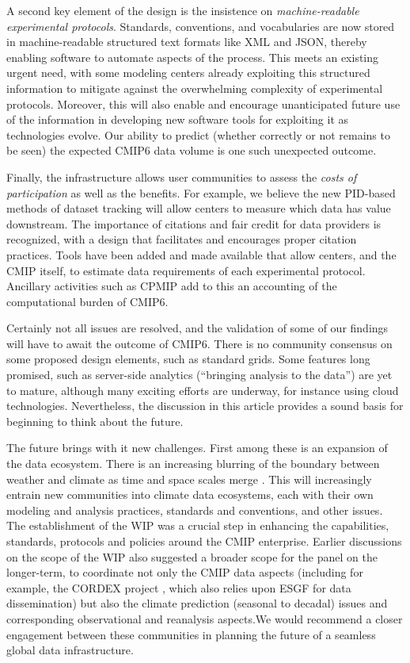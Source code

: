\documentclass[gmd,manuscript]{copernicus}
\newcommand{\pllabel}[1]{\label{p-#1}\linelabel{l-#1}}
\begin{document}
A second key element of the design is the insistence on
\emph{machine-readable experimental protocols}. Standards,
conventions, and vocabularies are now stored in machine-readable
structured text formats like XML and JSON, thereby enabling software
to automate aspects of the process. This meets an existing urgent
need, with some modeling centers already exploiting this structured
information to mitigate against the overwhelming complexity of
experimental protocols. Moreover, this will also enable and encourage
unanticipated future use of the information in developing new software
tools for exploiting it as technologies evolve. Our ability to predict
(whether correctly or not remains to be seen) the expected CMIP6 data
volume is one such unexpected outcome.

Finally, the infrastructure allows user communities to assess the
\emph{costs of participation} as well as the benefits. For example, we
believe the new PID-based methods of dataset tracking will allow
centers to measure which data has value downstream. The importance of
citations and fair credit for data providers is recognized, with a
design that facilitates and encourages proper citation practices.
Tools have been added and made available that allow centers, and the
CMIP itself, to estimate data requirements of each experimental
protocol. Ancillary activities such as CPMIP add to this an accounting
of the computational burden of CMIP6.

Certainly not all issues are resolved, and the validation of some of
our findings will have to await the outcome of CMIP6. There is no
community consensus on some proposed design elements, such as standard
grids. Some features long promised, such as server-side analytics
(``bringing analysis to the data'') are yet to mature, although many
exciting efforts are underway, for instance using cloud technologies.
Nevertheless, the discussion in this article provides a sound basis
for beginning to think about the future.

The future brings with it new challenges. First among these is an
expansion of the data ecosystem. There is an increasing blurring of
the boundary between weather and climate as time and space scales
merge \citep{ref:hoskins2013}. This will increasingly entrain new
communities into \pllabel{RC1-64} climate data ecosystems, each with
their own modeling and analysis practices, standards and conventions,
and other issues. The establishment of the WIP was a crucial step in
enhancing the capabilities, standards, protocols and policies around
the CMIP enterprise. Earlier discussions on the scope of the WIP also
suggested a broader scope for the panel on the longer-term, to
coordinate not only the CMIP data aspects (including for example, the
CORDEX project \citep{ref:lakeetal2017}, which also relies upon ESGF
for data dissemination) but also the climate prediction (seasonal to
decadal) issues and corresponding observational and reanalysis
aspects.We would recommend a closer engagement between these
communities in planning the future of a seamless global data
infrastructure.
\end{document}
